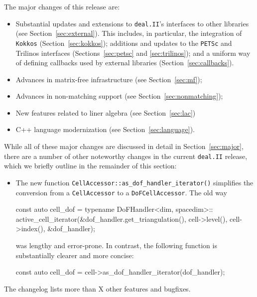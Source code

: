 \documentclass{ansarticle-preprint}
\newcommand{\specialword}[1]{\texttt{#1}}
\newcommand{\dealii}{{\specialword{deal.II}}\xspace}
\begin{document}
The major changes of this release are:
%
\begin{itemize}
  \item Substantial updates and extensions to \dealii{}'s interfaces
    to other libraries (see Section~\ref{sec:external}). This
    includes, in particular, the integration of \texttt{Kokkos} (Section~\ref{sec:kokkos});
    additions and updates to the \texttt{PETSc} and Trilinos
    interfaces
    (Sections~\ref{sec:petsc} and \ref{sec:trilinos}); and a uniform
    way of defining callbacks used by external libraries
    (Section~\ref{sec:callbacks}).
  \item Advances in matrix-free infrastructure (see Section~\ref{sec:mf});
  \item Advances in non-matching support (see Section~\ref{sec:nonmatching});
  \item New features related to liner algebra (see Section~\ref{sec:lac})
  \item C++ language modernization (see Section~\ref{sec:language}).
\end{itemize}
%

While all of these major changes are discussed in detail in
Section~\ref{sec:major}, there
are a number of other noteworthy changes in the current \dealii release,
which we briefly outline in the remainder of this section:
%
\begin{itemize}
  \item The new function \texttt{CellAccessor::as\_dof\_handler\_iterator()}
  simplifies the conversion from a \texttt{Cell\-Accessor} to a \texttt{DoF\-Cell\-Accessor}.
  The old way 
\begin{c++}
const auto cell_dof = typename DoFHandler<dim, spacedim>::
  active_cell_iterator(&dof_handler.get_triangulation(),
    cell->level(), cell->index(), &dof_handler);
\end{c++}
was lengthy and error-prone. In contrast, the following function is
substantially clearer and more concise:
\begin{c++}
const auto cell_dof = cell->as_dof_handler_iterator(dof_handler);
\end{c++}
\end{itemize}
%
The changelog lists more than X other features and bugfixes.

\end{document}
